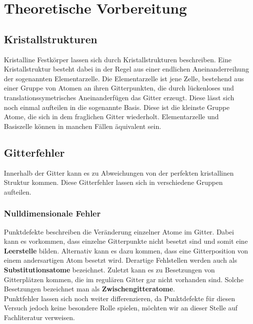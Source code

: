 ﻿\section{Theoretische Vorbereitung}
    \subsection{Kristallstrukturen}
        Kristalline Festkörper lassen sich durch Kristallstrukturen beschreiben. Eine Kristallstruktur besteht
        dabei in der Regel aus einer endlichen Aneinanderreihung der sogenannten Elementarzelle. Die Elementarzelle ist
        jene Zelle, bestehend aus einer Gruppe von Atomen an ihren Gitterpunkten, die durch lückenloses und translationssymetrisches Aneinanderfügen das Gitter erzeugt.
        Diese lässt sich noch einmal aufteilen in die sogenannte Basis. Diese ist die kleinste Gruppe Atome, die
        sich in dem fraglichen Gitter wiederholt. Elementarzelle und Basiszelle können in manchen Fällen äquivalent sein.
    \subsection{Gitterfehler}
        Innerhalb der Gitter kann es zu Abweichungen von der perfekten kristallinen Struktur kommen. Diese Gitterfehler lassen
        sich in verschiedene Gruppen aufteilen.
        \subsubsection*{Nulldimensionale Fehler}
            Punktdefekte beschreiben die Veränderung einzelner Atome im Gitter. Dabei kann es vorkommen, dass 
            einzelne Gitterpunkte nicht besetzt sind und somit eine \textbf{Leerstelle} bilden.
            Alternativ kann es dazu kommen, dass eine Gitterposition von einem andersartigen Atom besetzt wird.
            Derartige Fehlstellen werden auch als \textbf{Substitutionsatome} bezeichnet.
            Zuletzt kann es zu Besetzungen von Gitterplätzen kommen, die im regulären Gitter gar nicht vorhanden sind.
            Solche Besetzungen bezeichnet man als \textbf{Zwischengitteratome}.\\
            Punktfehler lassen sich noch weiter differenzieren, da Punktdefekte für diesen Versuch jedoch keine besondere
            Rolle spielen, möchten wir an dieser Stelle auf Fachliteratur verweisen.
